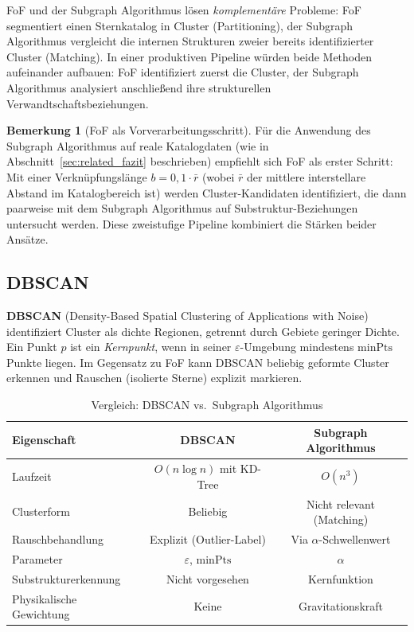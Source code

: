 ﻿\documentclass[a4paper,12pt]{report}
\theoremstyle{definition}
\newtheorem{bemerkung}{Bemerkung}
\begin{document}
FoF und der Subgraph Algorithmus lösen \emph{komplementäre} Probleme: FoF segmentiert einen Sternkatalog in Cluster (Partitioning), der Subgraph Algorithmus vergleicht die internen Strukturen zweier bereits identifizierter Cluster (Matching). In einer produktiven Pipeline würden beide Methoden aufeinander aufbauen: FoF identifiziert zuerst die Cluster, der Subgraph Algorithmus analysiert anschließend ihre strukturellen Verwandtschaftsbeziehungen.

\begin{bemerkung}[FoF als Vorverarbeitungsschritt]
Für die Anwendung des Subgraph Algorithmus auf reale Katalogdaten (wie in Abschnitt~\ref{sec:related_fazit} beschrieben) empfiehlt sich FoF als erster Schritt: Mit einer Verknüpfungslänge $b = 0{,}1 \cdot \bar{r}$ (wobei $\bar{r}$ der mittlere interstellare Abstand im Katalogbereich ist) werden Cluster-Kandidaten identifiziert, die dann paarweise mit dem Subgraph Algorithmus auf Substruktur-Beziehungen untersucht werden. Diese zweistufige Pipeline kombiniert die Stärken beider Ansätze.
\end{bemerkung}

\subsection{DBSCAN}
\label{ssec:dbscan}

\textbf{DBSCAN} (Density-Based Spatial Clustering of Applications with Noise) \cite{ester1996} identifiziert Cluster als dichte Regionen, getrennt durch Gebiete geringer Dichte. Ein Punkt $p$ ist ein \emph{Kernpunkt}, wenn in seiner $\varepsilon$-Umgebung mindestens $\mathrm{minPts}$ Punkte liegen. Im Gegensatz zu FoF kann DBSCAN beliebig geformte Cluster erkennen und Rauschen (isolierte Sterne) explizit markieren.

\begin{table}[H]
\centering
\caption{Vergleich: DBSCAN vs.\ Subgraph Algorithmus}
\label{tab:dbscan}
\begin{tabular}{lcc}
\toprule
Eigenschaft & DBSCAN & Subgraph Algorithmus \\
\midrule
Laufzeit & $O(n \log n)$ mit KD-Tree & $O(n^3)$ \\
Clusterform & Beliebig & Nicht relevant (Matching) \\
Rauschbehandlung & Explizit (Outlier-Label) & Via $\alpha$-Schwellenwert \\
Parameter & $\varepsilon$, $\mathrm{minPts}$ & $\alpha$ \\
Substrukturerkennung & Nicht vorgesehen & Kernfunktion \\
Physikalische Gewichtung & Keine & Gravitationskraft \\
\bottomrule
\end{tabular}
\end{table}
\end{document}
